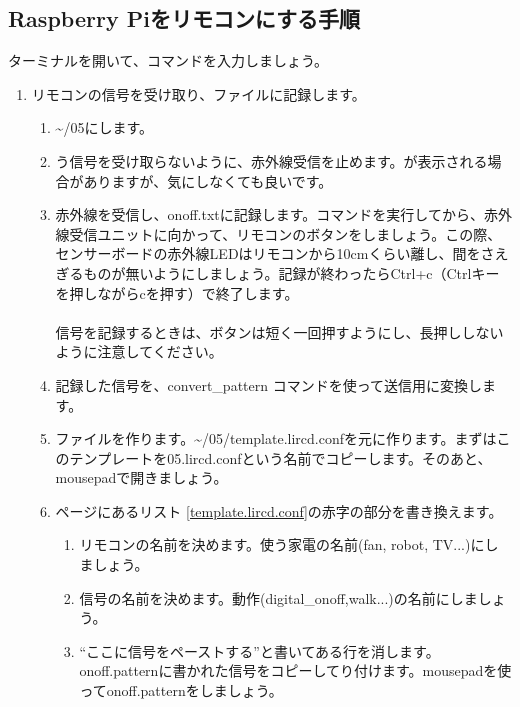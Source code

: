 \documentclass[text05.tex]{subfiles}
\begin{document}
\subsection{Raspberry Piをリモコンにする手順}
\noindent
ターミナルを開いて、コマンドを入力しましょう。
\begin{enumerate}
\item リモコンの信号を受け取り、ファイルに記録します。
 \begin{enumerate}[1]
  \item \textasciitilde /05にします。\\ 
  \item {}う信号を受け取らないように、赤外線受信を止めます。が表示される場合がありますが、気にしなくても良いです。 \\ 
  \item 赤外線を受信し、onoff.txtに記録します。コマンドを実行してから、赤外線受信ユニットに向かって、リモコンのボタンをしましょう。この際、センサーボードの赤外線LEDはリモコンから10cmくらい離し、間をさえぎるものが無いようにしましょう。記録が終わったらCtrl+c（Ctrlキーを押しながらcを押す）で終了します。\\ \\信号を記録するときは、ボタンは短く一回押すようにし、長押ししないように注意してください。
  \item 記録した信号を、convert\_pattern コマンドを使って送信用に変換します。\\ 
  \item {}ファイルを作ります。\textasciitilde /05/template.lircd.confを元に作ります。まずはこのテンプレートを05.lircd.confという名前でコピーします。そのあと、mousepadで開きましょう。\\ 
  \item \pageref{template.lircd.conf}ページにあるリスト \ref{template.lircd.conf}の赤字の部分を書き換えます。
  \begin{enumerate}[(1)]
    \item リモコンの名前を決めます。使う家電の名前(fan, robot, TV...)にしましょう。
    \item 信号の名前を決めます。動作(digital\_onoff,walk...)の名前にしましょう。
    \item “ここに信号をペーストする”と書いてある行を消します。onoff.patternに書かれた信号をコピーしてり付けます。mousepadを使ってonoff.patternをしましょう。\\ 

\end{enumerate}
\end{enumerate}
\end{enumerate}
\end{document}
